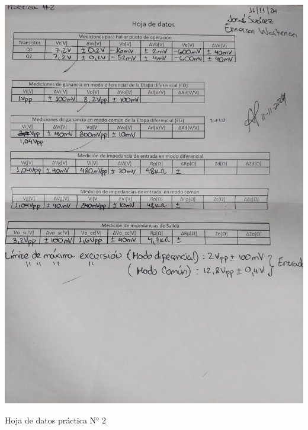 \begin{ilustracion}[ht]
    \centering
    \includegraphics[width=1.0\textwidth]{src/images/p2/p2-hoja-de-datos.jpg}
    \caption{Hoja de datos práctica N° 2}
    \label{ilus:hoja-de-datos-p2}
\end{ilustracion}

